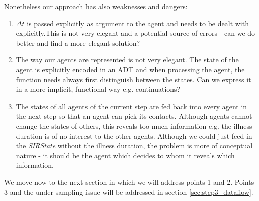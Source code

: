 Nonetheless our approach has also weaknesses and dangers:
\begin{enumerate}
	\item $\Delta t$ is passed explicitly as argument to the agent and needs to be dealt with explicitly.This is not very elegant and a potential source of errors - can we do better and find a more elegant solution? 
	\item The way our agents are represented is not very elegant. The state of the agent is explicitly encoded in an ADT and when processing the agent, the function needs always first distinguish between the states. Can we express it in a more implicit, functional way e.g. continuations?
	\item The states of all agents of the current step are fed back into every agent in the next step so that an agent can pick its contacts. Although agents cannot change the states of others, this reveals too much information e.g. the illness duration is of no interest to the other agents. Although we could just feed in the \textit{SIRState} without the illness duration, the problem is more of conceptual nature - it should be the agent which decides to whom it reveals which information.
\end{enumerate}

We move now to the next section in which we will address points 1 and 2. Points 3 and the under-sampling issue will be addressed in section \ref{sec:step3_dataflow}.